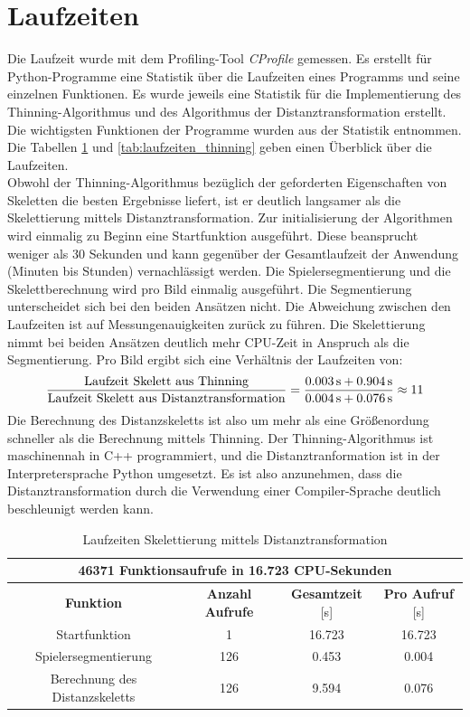 \section{Laufzeiten}
Die Laufzeit wurde mit dem Profiling-Tool \emph{CProfile} gemessen. Es erstellt für Python-Programme eine Statistik über die Laufzeiten eines Programms und seine einzelnen Funktionen. Es wurde jeweils eine Statistik
für die Implementierung des Thinning-Algorithmus und des Algorithmus der Distanztransformation erstellt. Die
wichtigsten Funktionen der Programme wurden aus der Statistik entnommen. Die Tabellen \ref{tab:laufzeiten_distanztransformation} und \ref{tab:laufzeiten_thinning} geben einen
Überblick über die Laufzeiten. \\
Obwohl der Thinning-Algorithmus bezüglich der geforderten Eigenschaften von Skeletten die besten Ergebnisse
liefert, ist er deutlich langsamer als die Skelettierung mittels
Distanztransformation. Zur initialisierung der Algorithmen wird einmalig zu Beginn eine Startfunktion ausgeführt. Diese beansprucht weniger als 30 Sekunden und kann gegenüber der Gesamtlaufzeit der Anwendung (Minuten bis Stunden) vernachlässigt werden. Die Spielersegmentierung und die Skelettberechnung wird pro Bild einmalig ausgeführt. Die Segmentierung unterscheidet sich bei den beiden Ansätzen nicht. Die Abweichung zwischen den Laufzeiten ist auf Messungenauigkeiten zurück zu führen.  Die Skelettierung nimmt bei beiden Ansätzen deutlich mehr CPU-Zeit in Anspruch als die Segmentierung. Pro Bild ergibt sich eine Verhältnis der Laufzeiten von:
\begin{equation}
\frac{\textnormal{Laufzeit Skelett aus Thinning}}{\textnormal{Laufzeit Skelett aus Distanztransformation}}=\frac{0.003\,\textnormal{s}+0.904\,\textnormal{s}}{0.004\,\textnormal{s}+0.076\,\textnormal{s}}\approx 11
\end{equation}
Die Berechnung des Distanzskeletts ist also um mehr als eine Größenordung schneller als die Berechnung mittels Thinning. Der Thinning-Algorithmus ist maschinennah in C++ programmiert, und die Distanztranformation ist in der Interpretersprache Python umgesetzt. Es ist also anzunehmen, dass die Distanztransformation durch die  Verwendung einer Compiler-Sprache deutlich beschleunigt werden kann.
\begin{table}[htbp]
\begin{center}
\begin{tabular}{|c|c|c|c|}
 \hline
  \multicolumn{4}{|c|}{46371 Funktionsaufrufe in 16.723 CPU-Sekunden} \\
  \hline
\hline 
\textbf{Funktion} & \textbf{Anzahl Aufrufe} & \textbf{Gesamtzeit} [s] & \textbf{Pro Aufruf} [s]\\ 
\hline Startfunktion & 1 & 16.723 & 16.723 \\ 
\hline Spielersegmentierung & 126 & 0.453 & 0.004  \\ 
\hline Berechnung des Distanzskeletts & 126 & 9.594 & 0.076    \\ 
\hline 
\end{tabular} 
\end{center}
\caption{Laufzeiten Skelettierung mittels Distanztransformation}
\label{tab:laufzeiten_distanztransformation}
\end{table}
